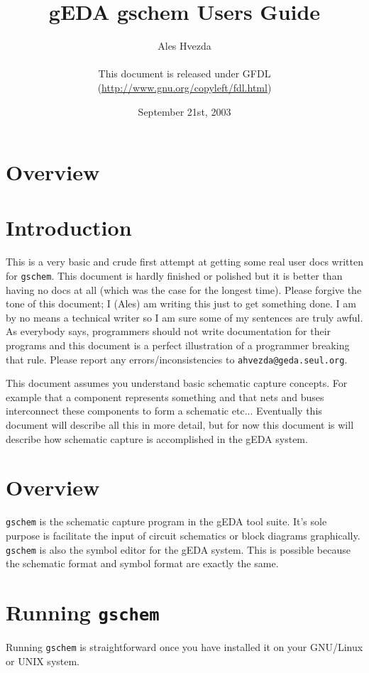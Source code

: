 \documentclass{article}
\title{gEDA gschem Users Guide}
\author{Ales Hvezda\\
        \\
        This document is released under GFDL\\ 
        (\url{http://www.gnu.org/copyleft/fdl.html})}
\date{September 21st, 2003}
\begin{document}
\maketitle
\newpage

\tableofcontents
\newpage


\section{Overview}

\section{Introduction}
This is a very basic and crude first attempt at getting some real user
docs written for {\tt gschem}.  This document is hardly finished or polished
but it is better than having no docs at all (which was the case for
the longest time).  Please forgive the tone of this document; I (Ales)
am writing this just to get something done.  I am by no means a
technical writer so I am sure some of my sentences are truly awful.
As everybody says, programmers should not write documentation for
their programs and this document is a perfect illustration of a
programmer breaking that rule.  Please report any
errors/inconsistencies to {\tt ahvezda@geda.seul.org}.

This document assumes you understand basic schematic capture
concepts.  For example that a component represents something and that 
nets and buses interconnect these components to form a schematic
etc...  Eventually this document will describe all this in more
detail, but for now this document is will describe how schematic
capture is accomplished in the gEDA system.

\section{Overview}
{\tt gschem} is the schematic capture program in the gEDA tool suite.
It's sole purpose is facilitate the input of circuit schematics or
block diagrams graphically.  {\tt gschem} is also the symbol editor for the
gEDA system.  This is possible because the schematic format and symbol 
format are exactly the same.

\section{Running {\tt gschem}}
Running {\tt gschem} is straightforward once you have installed it
on your GNU/Linux or UNIX system.
\end{document}
